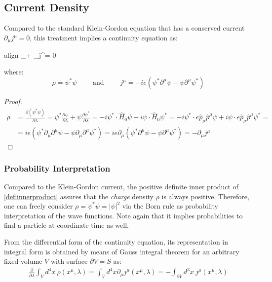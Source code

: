 \documentclass[twoside,a4paper,11pt]{article}
\numberwithin{equation}{section}
\newcommand{\boxedeq}[2]{\begin{empheq}[box={\fboxsep=6pt\fbox}]{align}\label{#1}#2\end{empheq}}
\begin{document}
\subsection{Current Density}
\label{subseq:currentdensity}
Compared to the standard Klein-Gordon equation that has a conserved current $\partial_\mu j^\mu = 0$, this treatment implies a continuity equation as:
\boxedeq{eq:continuityeqn}{
    \partial_\lambda \rho + \partial_\mu j^\mu = 0
}
where:
\begin{equation}
    \rho = \psi^* \psi \qquad \text{ and } \qquad j^\mu = - i e  ( \psi^* \partial^\mu \psi -  \psi \partial^\mu \psi^*)
\end{equation}



\begin{proof}
\begin{align*}
    \dot{\rho} & =  \frac{\partial\left( \psi^* \psi\right) }{\partial \lambda}  = \psi^* \frac{\partial\psi}{\partial \lambda}  +  \psi \frac{\partial\psi^*}{\partial \lambda}    = - i\psi^* \cdot \hat{H}_0 \psi +i \psi \cdot \hat{H}_0 \psi^* =  - i\psi^*  \cdot e \hat{p}_\mu \hat{p}^\mu \psi + i \psi  \cdot e \hat{p}_\mu \hat{p}^\mu  \psi^*  =\\ 
    & = i e \left( \psi^* \partial_\mu \partial^\mu \psi - \psi \partial_\mu \partial^\mu \psi^*   \right)
    =  i e  \partial_\mu \left( \psi^* \partial^\mu \psi - \psi \partial^\mu \psi^* \right)  = - \partial_\mu j^\mu
\end{align*}
\end{proof}

\subsubsection{Probability Interpretation}
Compared to the Klein-Gordon current, the positive definite inner product of \ref{def:innerproduct} assures that the \textit{charge} density $\rho$ is always positive. Therefore, one can freely consider $\rho = \psi^* \psi = |\psi|^2$ via the Born rule as probability interpretation of the wave functions. Note again that it implies probabilities to find a particle at coordinate time as well.

From the differential form of the continuity equation, its representation in integral form is obtained by means of Gauss integral theorem for an arbitrary fixed volume $V$ with surface $\partial V = S$ as:
\begin{eqnarray}
    \frac{\partial}{\partial \lambda} \int_V d^4 x\  \rho (x^\mu, \lambda) = \int_V d^4 x \partial_\mu j^\mu (x^\mu, \lambda)  = - \int_{\partial V}  d^3 x \ j^\mu (x^\mu, \lambda)   
    \label{eq:constantunity}
\end{eqnarray}
\end{document}
